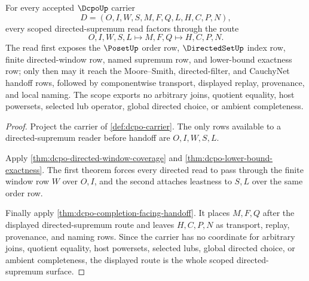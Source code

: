 \begin{theorem}
\label{thm:dcpo-directed-supremum-scope}
For every accepted $\DcpoUp$ carrier
$$
D=(O,I,W,S,M,F,Q,L,H,C,P,N),
$$
every scoped directed-supremum read factors through the route
$$
O,I,W,S,L \longmapsto M,F,Q \longmapsto H,C,P,N .
$$
The read first exposes the $\PosetUp$ order row, $\DirectedSetUp$ index row, finite directed-window row, named supremum row, and lower-bound exactness row; only then may it reach the Moore--Smith, directed-filter, and CauchyNet handoff rows, followed by componentwise transport, displayed replay, provenance, and local naming. The scope exports no arbitrary joins, quotient equality, host powersets, selected lub operator, global directed choice, or ambient completeness.
\end{theorem}
\begin{proof}
Project the carrier of \autoref{def:dcpo-carrier}. The only rows available to a directed-supremum reader before handoff are $O,I,W,S,L$.

Apply \autoref{thm:dcpo-directed-window-coverage} and \autoref{thm:dcpo-lower-bound-exactness}. The first theorem forces every directed read to pass through the finite window row $W$ over $O,I$, and the second attaches leastness to $S,L$ over the same order row.

Finally apply \autoref{thm:dcpo-completion-facing-handoff}. It places $M,F,Q$ after the displayed directed-supremum route and leaves $H,C,P,N$ as transport, replay, provenance, and naming rows. Since the carrier has no coordinate for arbitrary joins, quotient equality, host powersets, selected lubs, global directed choice, or ambient completeness, the displayed route is the whole scoped directed-supremum surface.
\end{proof}

